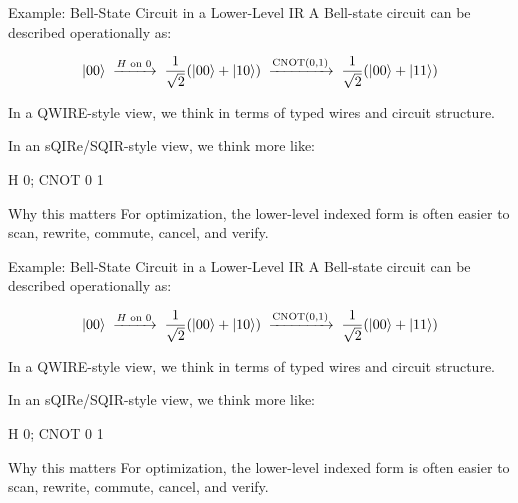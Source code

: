 \documentclass[aspectratio=169]{beamer}
\begin{document}
\begin{frame}{Example: Bell-State Circuit in a Lower-Level IR}
\justifying
A Bell-state circuit can be described operationally as:

\[
\ket{00}
\;\xrightarrow{H\text{ on }0}\;
\frac{1}{\sqrt{2}}(\ket{00}+\ket{10})
\;\xrightarrow{\mathrm{CNOT}(0,1)}\;
\frac{1}{\sqrt{2}}(\ket{00}+\ket{11})
\]

\vspace{0.8em}
In a QWIRE-style view, we think in terms of typed wires and circuit structure.

\vspace{0.4em}
In an sQIRe/SQIR-style view, we think more like:
\begin{center}
\ttfamily
H 0; \quad CNOT 0 1
\end{center}

\vspace{0.8em}
\begin{block}{Why this matters}
For optimization, the lower-level indexed form is often easier to scan, rewrite, commute, cancel, and verify.
\end{block}
\end{frame}
\begin{frame}{Example: Bell-State Circuit in a Lower-Level IR}
\justifying
A Bell-state circuit can be described operationally as:

\[
\ket{00}
\;\xrightarrow{H\text{ on }0}\;
\frac{1}{\sqrt{2}}(\ket{00}+\ket{10})
\;\xrightarrow{\mathrm{CNOT}(0,1)}\;
\frac{1}{\sqrt{2}}(\ket{00}+\ket{11})
\]

\vspace{0.8em}
In a QWIRE-style view, we think in terms of typed wires and circuit structure.

\vspace{0.4em}
In an sQIRe/SQIR-style view, we think more like:
\begin{center}
\ttfamily
H 0; \quad CNOT 0 1
\end{center}

\vspace{0.8em}
\begin{block}{Why this matters}
For optimization, the lower-level indexed form is often easier to scan, rewrite, commute, cancel, and verify.
\end{block}
\end{frame}
\end{document}
